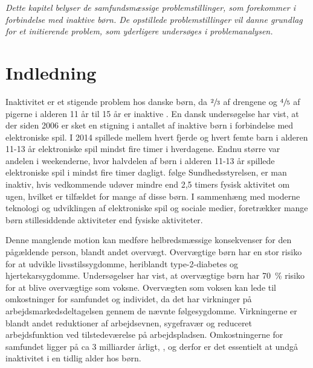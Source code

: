 \textit{Dette kapitel belyser de samfundsmæssige problemstillinger, som forekommer i forbindelse med inaktive børn. De opstillede problemstillinger vil danne grundlag for et initierende problem, som yderligere undersøges i problemanalysen.}

\section{Indledning}
Inaktivitet er et stigende problem hos danske børn, da $\sfrac{2}{3}$ af drengene og $\sfrac{4}{5}$ af pigerne i alderen 11 år til 15 år er inaktive \citep{SundhedsstyrrelsenFaktaark}. %
En dansk undersøgelse har vist, at der siden 2006 er sket en stigning i antallet af inaktive børn i forbindelse med elektroniske spil. I 2014 spillede mellem hvert fjerde og hvert femte barn i alderen 11-13 år elektroniske spil mindst fire timer i hverdagene. Endnu større var andelen i weekenderne, hvor halvdelen af børn i alderen 11-13 år spillede elektroniske spil i mindst fire timer dagligt. \citep{Universitet2014} følge Sundhedsstyrelsen, er man inaktiv, hvis vedkommende udøver mindre end 2,5 timers fysisk aktivitet om ugen\citep{Kiens2007}, hvilket er tilfældet for mange af disse børn.  I sammenhæng med moderne teknologi  og udviklingen af elektroniske spil og sociale medier, foretrækker mange børn stillesiddende aktiviteter end fysiske aktiviteter.\citep{Universitet2014}	

Denne manglende motion kan medføre helbredsmæssige konsekvenser for den pågældende person, blandt andet overvægt. Overvægtige børn har en stor risiko for at udvikle livsstilssygdomme, heriblandt type-2-diabetes og hjertekarsygdomme. Undersøgelser har vist, at overvægtige børn har 70~\% risiko for at blive overvægtige som voksne. \citep{Reilly2006} 
Overvægten som voksen kan lede til omkostninger for samfundet og individet, da det har virkninger på arbejdsmarkedsdeltagelsen gennem de nævnte følgesygdomme. Virkningerne er blandt andet reduktioner af arbejdsevnen, sygefravær og reduceret arbejdsfunktion ved tilstedeværelse på arbejdspladsen. Omkostningerne for samfundet ligger på ca 3 milliarder årligt, \citep{BarudThomsen2007}, \citep{Sundhedsministeriet2007} og derfor er det essentielt at undgå inaktivitet i en tidlig alder hos børn.

